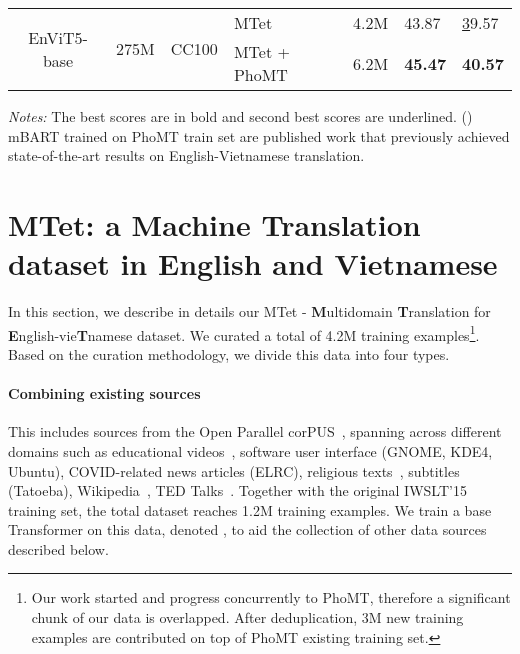 \documentclass[11pt]{article}
\begin{document}
\begin{table*}[ht]
\begin{threeparttable}
\begin{tabular}{c|c|c|ll|l|l}
\multirow{2}{*}{EnViT5-base} & \multirow{2}{*}{275M}                            
                                                                           & \multirow{2}{*}{CC100}       & \multicolumn{1}{l|}{MTet}                 & 4.2M     & 43.87                                       & {\ul 39.57}                                \\ \cline{4-7} 
                             &                                                 &                              & \multicolumn{1}{l|}{MTet + PhoMT}         & 6.2M     & \textbf{45.47}                              & \textbf{40.57}                             \\ \hline
\end{tabular}
\begin{tablenotes}
      \small
      \item \textit{Notes:} The best scores are in bold and second best scores are underlined. (\textit{}) mBART trained on PhoMT train set are published work \cite{phomt} that previously achieved state-of-the-art results on English-Vietnamese translation. 
\end{tablenotes}
\end{threeparttable}

\label{phomt_results}
\end{table*} 


\section{MTet: a Machine Translation dataset in English and Vietnamese}
\label{data}
In this section, we describe in details our MTet - \textbf{M}ultidomain \textbf{T}ranslation for \textbf{E}nglish-vie\textbf{T}namese dataset. We curated a total of 4.2M training examples\footnote{Our work started and progress concurrently to PhoMT, therefore a significant chunk of our data is overlapped. After deduplication, 3M new training examples are contributed on top of PhoMT existing training set.}. 
Based on the curation methodology, we divide this data into four types.

\paragraph{Combining existing sources} This includes sources from the Open Parallel corPUS~\cite{TIEDEMANN12463}, spanning across different domains such as educational videos~\cite{abdelali-etal-2014-amara}, software user interface (GNOME, KDE4, Ubuntu), COVID-related news articles (ELRC), religious texts~\cite{christodouloupoulos2015massively}, subtitles (Tatoeba), Wikipedia~\cite{wolk2014building}, TED Talks~\cite{reimers-2020-multilingual-sentence-bert}. Together with the original IWSLT'15~\cite{iwslt2015} training set, the total dataset reaches 1.2M training examples. 
We train a base Transformer on this data, denoted , to aid the collection of other data sources described below.
\end{document}
